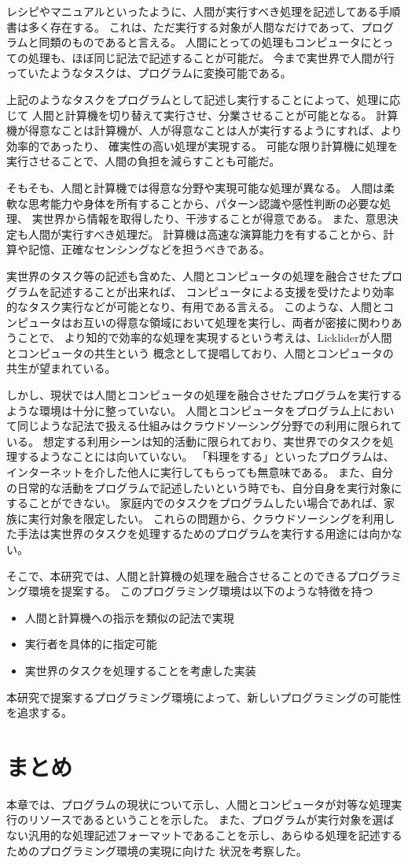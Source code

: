 レシピやマニュアルといったように、人間が実行すべき処理を記述してある手順書は多く存在する。
これは、ただ実行する対象が人間なだけであって、プログラムと同類のものであると言える。
人間にとっての処理もコンピュータにとっての処理も、ほぼ同じ記法で記述することが可能だ。
今まで実世界で人間が行っていたようなタスクは、プログラムに変換可能である。

上記のようなタスクをプログラムとして記述し実行することによって、処理に応じて
人間と計算機を切り替えて実行させ、分業させることが可能となる。
計算機が得意なことは計算機が、人が得意なことは人が実行するようにすれば、より効率的であったり、
確実性の高い処理が実現する。
可能な限り計算機に処理を実行させることで、人間の負担を減らすことも可能だ。

そもそも、人間と計算機では得意な分野や実現可能な処理が異なる。
人間は柔軟な思考能力や身体を所有することから、パターン認識や感性判断の必要な処理、
実世界から情報を取得したり、干渉することが得意である。
また、意思決定も人間が実行すべき処理だ。
計算機は高速な演算能力を有することから、計算や記憶、正確なセンシングなどを担うべきである。

実世界のタスク等の記述も含めた、人間とコンピュータの処理を融合させたプログラムを記述することが出来れば、
コンピュータによる支援を受けたより効率的なタスク実行などが可能となり、有用である言える。
このような、人間とコンピュータはお互いの得意な領域において処理を実行し、両者が密接に関わりあうことで、
より知的で効率的な処理を実現するという考えは、Lickliderが人間とコンピュータの共生\cite{man-computer-symbiosis}という
概念として提唱しており、人間とコンピュータの共生が望まれている。

しかし、現状では人間とコンピュータの処理を融合させたプログラムを実行するような環境は十分に整っていない。
人間とコンピュータをプログラム上において同じような記法で扱える仕組みはクラウドソーシング分野での利用に限られている。
想定する利用シーンは知的活動に限られており、実世界でのタスクを処理するようなことには向いていない。
「料理をする」といったプログラムは、インターネットを介した他人に実行してもらっても無意味である。
また、自分の日常的な活動をプログラムで記述したいという時でも、自分自身を実行対象にすることができない。
家庭内でのタスクをプログラムしたい場合であれば、家族に実行対象を限定したい。
これらの問題から、クラウドソーシングを利用した手法は実世界のタスクを処理するためのプログラムを実行する用途には向かない。

そこで、本研究では、人間と計算機の処理を融合させることのできるプログラミング環境を提案する。
このプログラミング環境は以下のような特徴を持つ

\begin{itemize}
\itemsep1pt\parskip0pt
\item
  人間と計算機への指示を類似の記法で実現
\item
  実行者を具体的に指定可能
\item
  実世界のタスクを処理することを考慮した実装
\end{itemize}

本研究で提案するプログラミング環境によって、新しいプログラミングの可能性を追求する。

\section{まとめ}\label{ux307eux3068ux3081}

本章では、プログラムの現状について示し、人間とコンピュータが対等な処理実行のリソースであるということを示した。
また、プログラムが実行対象を選ばない汎用的な処理記述フォーマットであることを示し、あらゆる処理を記述するためのプログラミング環境の実現に向けた
状況を考察した。
